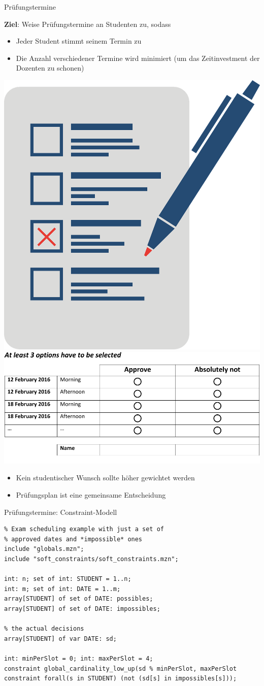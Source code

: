 \documentclass[handout,10pt,xcolor={dvipsnames},fleqn]{beamer}
\begin{document}
\begin{frame}[fragile]{Prüfungstermine}

\textbf{Ziel}: Weise Prüfungstermine an Studenten zu, sodass
\begin{itemize}
\item Jeder Student stimmt seinem Termin zu 
\item Die Anzahl verschiedener Termine wird minimiert (um das Zeitinvestment der Dozenten zu schonen)
\end{itemize}

\begin{center}
\includegraphics[width=.15\textwidth]{img/voting.png}
\hspace*{4ex}
\includegraphics[width=.5\textwidth]{img/Voting.pdf}
\end{center}

\begin{itemize}
\item Kein studentischer Wunsch sollte höher gewichtet werden
\item Prüfungsplan ist eine gemeinsame Entscheidung

\end{itemize}
\end{frame}

\begin{frame}[fragile]{Prüfungstermine: Constraint-Modell}
\begin{lstlisting}
% Exam scheduling example with just a set of 
% approved dates and *impossible* ones
include "globals.mzn";
include "soft_constraints/soft_constraints.mzn";

int: n; set of int: STUDENT = 1..n; 
int: m; set of int: DATE = 1..m;
array[STUDENT] of set of DATE: possibles;
array[STUDENT] of set of DATE: impossibles;

% the actual decisions
array[STUDENT] of var DATE: sd;

int: minPerSlot = 0; int: maxPerSlot = 4;
constraint global_cardinality_low_up(sd % minPerSlot, maxPerSlot
constraint forall(s in STUDENT) (not (sd[s] in impossibles[s])); 
 
\end{lstlisting}
\end{frame}
\end{document}

